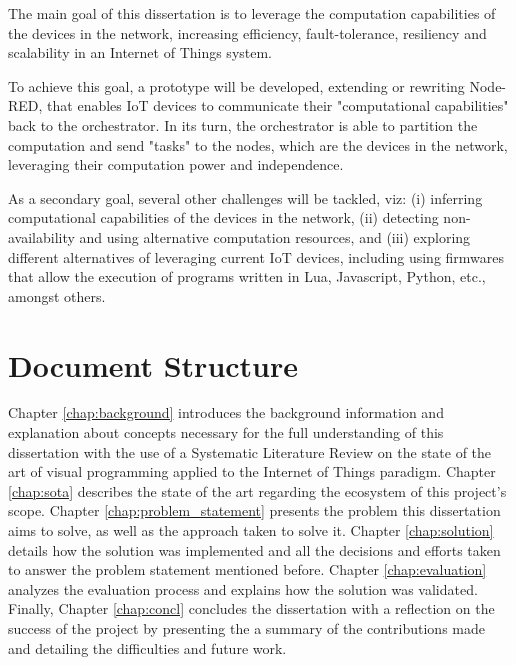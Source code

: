 The main goal of this dissertation is to leverage the computation capabilities of the devices in the network, increasing efficiency, fault-tolerance, resiliency and scalability in an Internet of Things system.
\par To achieve this goal, a prototype will be developed, extending or rewriting Node-RED, that enables IoT devices to communicate their "computational capabilities" back to the orchestrator. In its turn, the orchestrator is able to partition the computation and send "tasks" to the nodes, which are the devices in the network, leveraging their computation power and independence.
\par As a secondary goal, several other challenges will be tackled, viz: (i) inferring computational capabilities of the devices in the network, (ii) detecting non-availability and using alternative computation resources, and (iii) exploring different alternatives of leveraging current IoT devices, including using firmwares that allow the execution of programs written in Lua, Javascript, Python, etc., amongst others.

\section{Document Structure} \label{sec:document structure}

Chapter \ref{chap:background} introduces the background information and explanation about concepts necessary for the full understanding of this dissertation with the use of a Systematic Literature Review on the state of the art of visual programming applied to the Internet of Things paradigm. Chapter \ref{chap:sota} describes the state of the art regarding the ecosystem of this project's scope. Chapter \ref{chap:problem_statement} presents the problem this dissertation aims to solve, as well as the approach taken to solve it. Chapter \ref{chap:solution} details how the solution was implemented and all the decisions and efforts taken to answer the problem statement mentioned before. Chapter \ref{chap:evaluation} analyzes the evaluation process and explains how the solution was validated. Finally, Chapter \ref{chap:concl} concludes the dissertation with a reflection on the success of the project by presenting the a summary of the contributions made and detailing the difficulties and future work.
